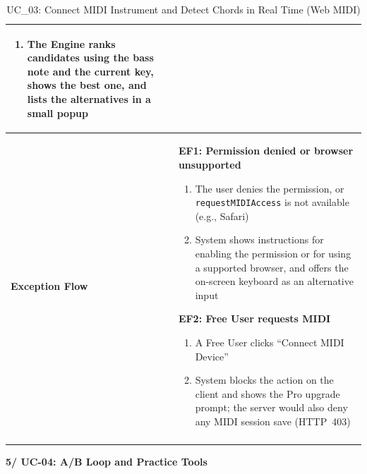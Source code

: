 \documentclass[a4paper]{article}
\newlength{\ucLeft}
\begin{document}
\begin{longtable}{|>{\bfseries}p{\ucLeft}|p{\dimexpr\linewidth-\ucLeft-2\tabcolsep-2\arrayrulewidth}|}
\begin{enumerate}[leftmargin=1.5em, nosep, topsep=2pt, partopsep=0pt, parsep=0pt, after=\strut]
    \item The Engine ranks candidates using the bass note and the current key, shows the best one, and lists the alternatives in a small popup
\end{enumerate}
\\ \hline
Exception Flow &
\textbf{EF1: Permission denied or browser unsupported}
\begin{enumerate}[leftmargin=1.5em, nosep, topsep=2pt, partopsep=0pt, parsep=0pt, after=\strut]
    \item The user denies the permission, or \texttt{requestMIDIAccess} is not available (e.g., Safari)
    \item System shows instructions for enabling the permission or for using a supported browser, and offers the on-screen keyboard as an alternative input
\end{enumerate}
\textbf{EF2: Free User requests MIDI}
\begin{enumerate}[leftmargin=1.5em, nosep, topsep=2pt, partopsep=0pt, parsep=0pt, after=\strut]
    \item A Free User clicks ``Connect MIDI Device''
    \item System blocks the action on the client and shows the Pro upgrade prompt; the server would also deny any MIDI session save (HTTP~403)
\end{enumerate}
\\ \hline
\caption{UC\_03: Connect MIDI Instrument and Detect Chords in Real Time (Web MIDI)}\label{tab:uc03}
\end{longtable}

\vspace{0.5em}
\noindent\textbf{5/ UC-04: A/B Loop and Practice Tools}
\end{document}
